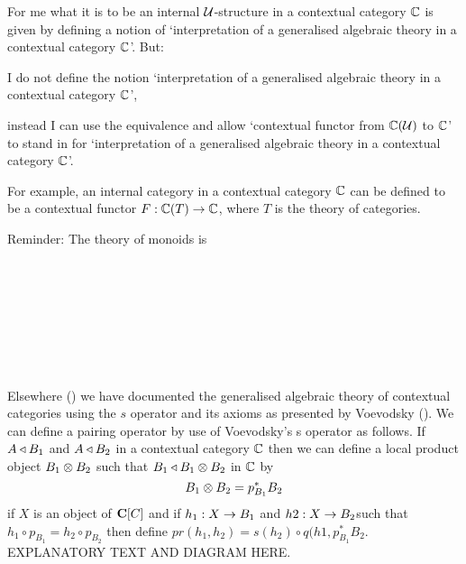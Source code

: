 \documentclass[10pt,a4paper]{article}
\theoremstyle{remark}
\begin{document}
\note For me what it is to be an internal $\gat[U]$-structure in a contextual category $\ccat[C]$ is given by defining a notion of `interpretation of a generalised algebraic theory \gat[U] in a contextual category $\ccat[C]$'. But:
\begin{point}
I do not define the notion `interpretation of a generalised algebraic theory \gat[U] in a contextual category $\ccat[C]$',
\end{point}
\begin{point}
instead I can use the equivalence and allow
`contextual functor from $\CofU$ to $\ccat[C]$' to stand in for
 `interpretation of a generalised algebraic theory \gat[U] in a contextual category $\ccat[C]$'.
\end{point}

\note 
For example, an internal category in a contextual category $\ccat[C]$
can be defined to be a contextual functor $F: \ccat[C](T) \morph  \ccat[C]$, where $T$ is the theory of categories.

\note
Reminder: The theory of monoids is
\begin{gatrules}
\gatintros
{}
 \\
 \\
 \\
\gataxioms

\begin{gatgroup}{}
 \\
\end{gatgroup} \\
\end{gatrules}

\note Elsewhere (\cite{CartmellAxiomatisations}) we have documented the generalised algebraic theory of contextual categories
using the $s$ operator and its axioms as presented by Voevodsky (\cite{Voevodsky14C}). 
We can define a pairing operator by use of Voevodsky's s operator as follows. If $A \base B_1$ and $A \base B_2$ in a contextual category
$\ccat[C]$ then we can define a local product object $B_1 \cross B_2$ such that $B_1 \base B_1 \cross B_2$ in $\ccat[C]$
by
\begin{equation*}
B_1 \cross B_2=p_{B_1}^*B_2
\end{equation*}
if $X$ is an object of $\catc[C]$ and if $h_1:X \morph B_1$ and $h2:X \morph B_2$such that
$h_1 \circ p_{B_1}= h_2 \circ p_{B_2}$ then define $pr(h_1,h_2)=s(h_2)\circ q(h1,p_{B_1}^*B_2$.
EXPLANATORY TEXT AND DIAGRAM HERE.  
\end{document}
